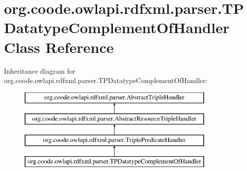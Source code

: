 \hypertarget{classorg_1_1coode_1_1owlapi_1_1rdfxml_1_1parser_1_1_t_p_datatype_complement_of_handler}{\section{org.\-coode.\-owlapi.\-rdfxml.\-parser.\-T\-P\-Datatype\-Complement\-Of\-Handler Class Reference}
\label{classorg_1_1coode_1_1owlapi_1_1rdfxml_1_1parser_1_1_t_p_datatype_complement_of_handler}
}
Inheritance diagram for org.\-coode.\-owlapi.\-rdfxml.\-parser.\-T\-P\-Datatype\-Complement\-Of\-Handler\-:\begin{figure}[H]
\begin{center}
\leavevmode
\includegraphics[height=4.000000cm]{classorg_1_1coode_1_1owlapi_1_1rdfxml_1_1parser_1_1_t_p_datatype_complement_of_handler}
\end{center}
\end{figure}

